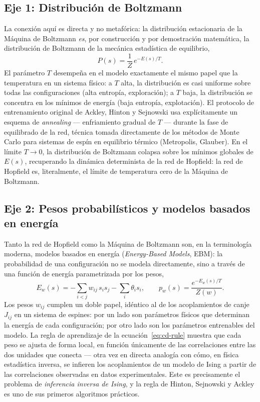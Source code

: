 \documentclass[12pt]{article}
\begin{document}
\subsection{Eje 1: Distribución de Boltzmann}

La conexión aquí es directa y no metafórica: la distribución estacionaria de la Máquina de Boltzmann \emph{es}, por construcción y por demostración matemática, la distribución de Boltzmann de la mecánica estadística de equilibrio,
\begin{equation}
P(s) = \frac{1}{Z}\, e^{-E(s)/T}.
\end{equation}
El parámetro $T$ desempeña en el modelo exactamente el mismo papel que la temperatura en un sistema físico: a $T$ alta, la distribución es casi uniforme sobre todas las configuraciones (alta entropía, exploración); a $T$ baja, la distribución se concentra en los mínimos de energía (baja entropía, explotación). El protocolo de entrenamiento original de Ackley, Hinton y Sejnowski usa explícitamente un esquema de \emph{annealing} --- enfriamiento gradual de $T$ --- durante la fase de equilibrado de la red, técnica tomada directamente de los métodos de Monte Carlo para sistemas de espín en equilibrio térmico (Metropolis, Glauber). En el límite $T\to 0$, la distribución de Boltzmann colapsa sobre los mínimos globales de $E(s)$, recuperando la dinámica determinista de la red de Hopfield: la red de Hopfield es, literalmente, el límite de temperatura cero de la Máquina de Boltzmann.

\subsection{Eje 2: Pesos probabilísticos y modelos basados en energía}

Tanto la red de Hopfield como la Máquina de Boltzmann son, en la terminología moderna, modelos basados en energía (\emph{Energy-Based Models}, EBM): la probabilidad de una configuración no se modela directamente, sino a través de una función de energía parametrizada por los pesos,
\begin{equation}
E_w(s) = -\sum_{i<j} w_{ij}\, s_i s_j - \sum_i \theta_i s_i ,
\qquad
p_w(s) = \frac{e^{-E_w(s)/T}}{Z(w)} .
\end{equation}
Los pesos $w_{ij}$ cumplen un doble papel, idéntico al de los acoplamientos de canje $J_{ij}$ en un sistema de espines: por un lado son parámetros físicos que determinan la energía de cada configuración; por otro lado son los parámetros entrenables del modelo. La regla de aprendizaje de la ecuación~\eqref{eq:cd-rule} muestra que cada peso se ajusta de forma local, en función únicamente de las correlaciones entre las dos unidades que conecta --- otra vez en directa analogía con cómo, en física estadística inversa, se infieren los acoplamientos de un modelo de Ising a partir de las correlaciones observadas en datos experimentales. Este es precisamente el problema de \emph{inferencia inversa de Ising}, y la regla de Hinton, Sejnowski y Ackley es uno de sus primeros algoritmos prácticos.
\end{document}
